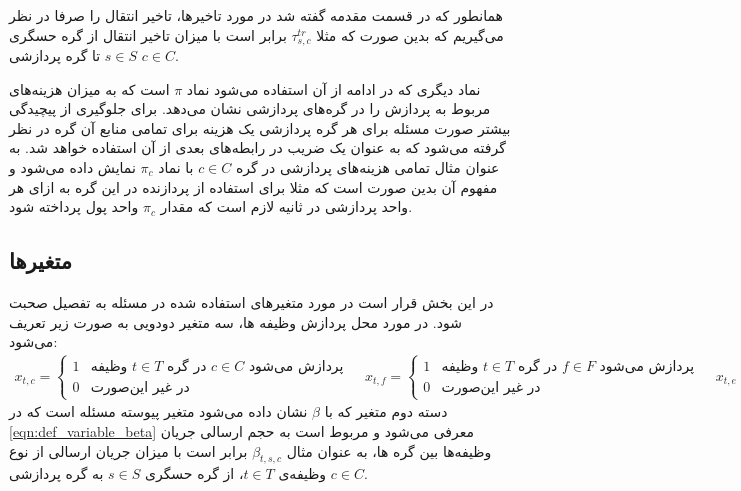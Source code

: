 	همانطور که در قسمت مقدمه گفته شد در مورد تاخیرها، تاخیر انتقال را صرفا در نظر می‌گیریم که بدین صورت که مثلا $\tau_{s,c}^{tr}$ برابر است با میزان تاخیر انتقال از گره حسگری $s \in S$ تا گره پردازشی $c \in C$. 
	
	نماد دیگری که در ادامه از آن استفاده می‌شود نماد $\pi$ است که به میزان هزینه‌های مربوط به پردازش را در گره‌های پردازشی نشان می‌دهد. برای جلوگیری از پیچیدگی بیشتر صورت مسئله برای هر گره پردازشی یک هزینه برای تمامی منابع آن گره در نظر گرفته می‌شود که به عنوان یک ضریب در رابطه‌های بعدی از آن استفاده خواهد شد. به عنوان مثال تمامی هزینه‌های پردازشی در گره $c \in C$ با نماد $\pi_c$ نمایش داده می‌شود و مفهوم آن بدین صورت است که مثلا برای استفاده از پردازنده در این گره به ازای هر واحد پردازشی در ثانیه لازم است که مقدار $\pi_c$ واحد پول پرداخته شود. 
	\subsection{متغیرها}
	در این بخش قرار است در مورد متغیرهای استفاده شده در مسئله به تفصیل صحبت شود. 
	در مورد محل پردازش وظیفه ها، سه متغیر دودویی به صورت زیر تعریف می‌شود:
	    \begin{subequations}\label{eqn:def_variable_x}
		\begin{align}
		x_{t,c} =
		\begin{cases}
		1 & \text{وظیفه $t \in T$ در گره $c \in C$ پردازش می‌شود } \\
		0 & \text{در غیر این‌صورت}
		\end{cases}
		\end{align}
		
		\begin{align}
		x_{t,f} =
		\begin{cases}
		1 & \text{وظیفه $t \in T$ در گره $f \in F$ پردازش می‌شود } \\
		0 & \text{در غیر این‌صورت}
		\end{cases}
		\end{align}
		
		\begin{align}
		x_{t,e} =
		\begin{cases}
		1 & \text{وظیفه $t \in T$ در گره $e \in E$ پردازش می‌شود } \\
		0 & \text{در غیر این‌صورت}
		\end{cases}
		\end{align}
	\end{subequations}
	دسته دوم متغیر که با $\beta$ نشان داده می‌شود متغیر پیوسته مسئله است که در \cref{eqn:def_variable_beta} معرفی می‌شود و مربوط است به حجم ارسالی جریان وظیفه‌ها بین گره ها، به عنوان مثال $\beta_{t,s,c}$ برابر است با میزان جریان ارسالی از نوع وظیفه‌ی $t \in T$، از گره حسگری $s \in S$ به گره پردازشی $c \in C$.
